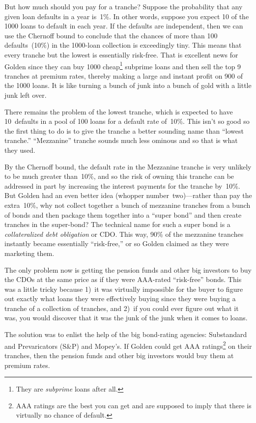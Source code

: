But how much should you pay for a tranche?  Suppose the probability
that any given loan defaults in a year is~1\%.  In other words,
suppose you expect 10 of the 1000 loans to default in each year.  If
the defaults are independent, then we can use the Chernoff bound to
conclude that the chances of more than 100 defaults~(10\%) in the
1000-loan collection is exceedingly tiny.  This means that every
tranche but the lowest is essentially risk-free.  That is excellent
news for Golden since they can buy 1000 cheap\footnote{They are
  \emph{subprime} loans after all.} subprime loans and then sell the
top 9 tranches at premium rates, thereby making a large and instant
profit on 900 of the 1000 loans.  It is like turning a bunch of junk
into a bunch of gold with a little junk left over.

There remains the problem of the lowest tranche, which is expected to
have 10~defaults in a pool of 100 loans for a default rate of~10\%.
This isn't so good so the first thing to do is to give the tranche a
better sounding name than ``lowest tranche.''  ``Mezzanine'' tranche
sounds much less ominous and so that is what they used.

By the Chernoff bound, the default rate in the Mezzanine tranche is
very unlikely to be much greater than~10\%, and so the risk of owning
this tranche can be addressed in part by increasing the interest
payments for the tranche by~10\%.  But Golden had an even better idea
(whopper number~two)---rather than pay the extra~10\%, why not collect
together a bunch of mezzanine tranches from a bunch of bonds and then
package them together into a ``super bond'' and then create tranches
in the super-bond?  The technical name for such a super bond is a
\emph{collateralized debt obligation} or CDO\@.  This way, 90\% of the
mezzanine tranches instantly became essentially ``risk-free,'' or so
Golden claimed as they were marketing them.

The only problem now is getting the pension funds and other big
investors to buy the CDOs at the same price as if they were AAA-rated
``risk-free'' bonds.  This was a little tricky because 1)~it was
virtually impossible for the buyer to figure out exactly what loans
they were effectively buying since they were buying a tranche of a
collection of tranches, and 2)~if you could ever figure out what it
was, you would discover that it was the junk of the junk when it comes
to loans.

The solution was to enlist the help of the big bond-rating agencies:
Substandard and Prevaricators (S\&P) and Mopey's.  If Golden could get
AAA ratings\footnote{AAA ratings are the best you can get and are
  supposed to imply that there is virtually no chance of default.} on
their tranches, then the pension funds and other big investors would
buy them at premium rates.

